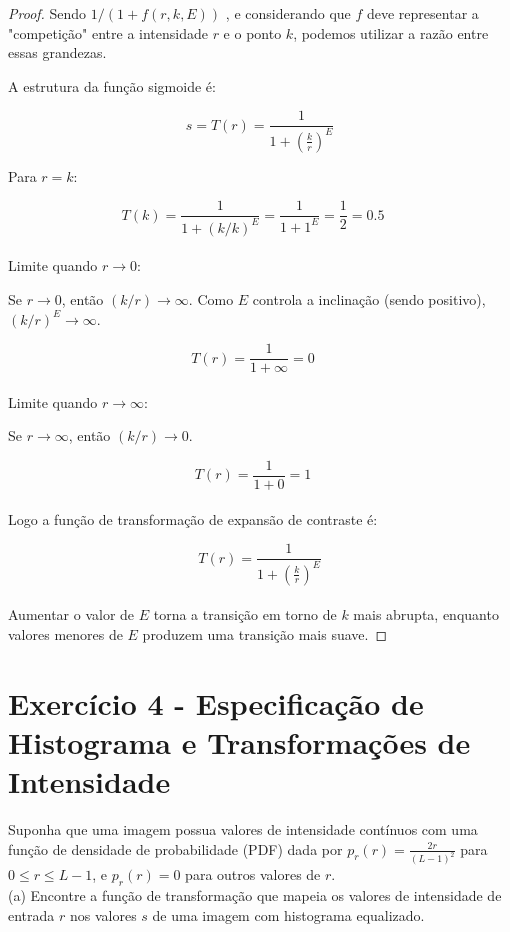 \documentclass[a4paper,12pt]{article}
\begin{document}
\begin{proof}

Sendo $1 / (1 + f(r, k, E))$ , e considerando que $f$ deve representar a "competição" entre a intensidade $r$ e o ponto $k$, podemos utilizar a razão entre essas grandezas.

A estrutura da função sigmoide é:

$$s = T(r) = \frac{1}{1 + \left(\frac{k}{r}\right)^E}$$

Para $r = k$:

$$T(k) = \frac{1}{1 + (k/k)^E} = \frac{1}{1 + 1^E} = \frac{1}{2} = 0.5 \quad$$\\

Limite quando $r \to 0$:

Se $r \to 0$, então $(k/r) \to \infty$. Como $E$ controla a inclinação (sendo positivo), $(k/r)^E \to \infty$.

$$T(r) = \frac{1}{1 + \infty} = 0 \quad$$\\

Limite quando $r \to \infty$:

Se $r \to \infty$, então $(k/r) \to 0$.

$$T(r) = \frac{1}{1 + 0} = 1 \quad$$\\

Logo a função de transformação de expansão de contraste é:


$$T(r) = \frac{1}{1 + \left(\frac{k}{r}\right)^E}$$\\

Aumentar o valor de $E$ torna a transição em torno de $k$ mais abrupta, enquanto valores menores de $E$ produzem uma transição mais suave.

\end{proof}

\newpage
\section*{Exercício 4 - Especificação de Histograma e Transformações de Intensidade}

Suponha que uma imagem possua valores de intensidade contínuos com uma função de densidade de
probabilidade (PDF) dada por $p_{r}(r) = \frac{2r}{(L-1)^2}$ para $0 \leq r \leq L-1$, e $p_{r}(r) = 0$ para outros valores de $r$.\\

(a) Encontre a função de transformação que mapeia os valores de intensidade de entrada $r$ nos valores
$s$ de uma imagem com histograma equalizado.\\
\end{document}
